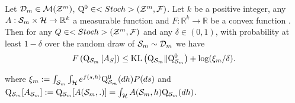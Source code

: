 \begin{theorem}
\label{th: rivasplata2020}
Let $\mathcal{D}_{m} \in \mathcal{M}(\mathcal{Z}^m)$, $\mathrm{Q}^{0} \in <Stoch>(\mathcal{Z}^m,\mathcal{F})$. Let $k$ be a positive integer,  any  $A: \mathcal{S}_m \times \mathcal{H} \rightarrow \mathbb{R}^{k}$ a measurable function and $F: \mathbb{R}^{k} \rightarrow \mathbb{R}$ be a convex function .
Then for any $Q \in <Stoch>(\mathcal{Z}^m,\mathcal{F})$ and any $\delta \in(0,1)$, with probability at least $1-\delta$ over the random draw of $\mathcal{S}_m \sim \mathcal{D}_{m}$ we have
$$
F\left(\mathrm{Q}_{\mathcal{S}_m}\left[A_{S}\right]\right) \leq \mathrm{KL}\left(\mathrm{Q}_{\mathcal{S}_m} \| \mathrm{Q}_{\mathcal{S}_m}^{0}\right)+\log (\xi_m / \delta) .
$$

where $\xi_m:=\int_{\mathcal{S}_m} \int_{\mathcal{H}} e^{f(s, h)} \mathrm{Q}_{\mathcal{S}_m}^{0}(d h) P(d s)$ and $\mathrm{Q}_{\mathcal{S}_m}[A_{\mathcal{S}_m}]:= \mathrm{Q}_{\mathcal{S}_m}[A(\mathcal{S}_m,.)]= \int_{\mathcal{H}} A(\mathcal{S}_m,h) \mathrm{Q}_{\mathcal{S}_m}(dh)$.
\end{theorem}


